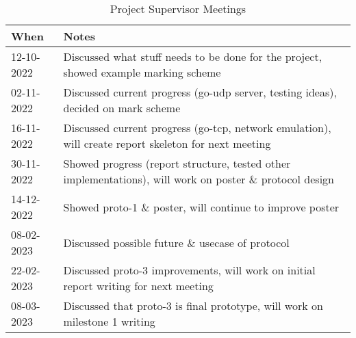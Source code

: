 \begin{table}[h!]
    \caption{Project Supervisor Meetings}
    \label{tab:project-supervisor-meetings}
    \centering
	\begin{tabularx}{\textwidth}{l X}
		\textbf{When} & \textbf{Notes}                                                                                           \\
		\hline
		12-10-2022    & Discussed what stuff needs to be done for the project, showed example marking scheme                     \\
		\hline
		02-11-2022    & Discussed current progress (go-udp server, testing ideas), decided on mark scheme                        \\
		\hline
		16-11-2022    & Discussed current progress (go-tcp, network emulation), will create report skeleton for next meeting     \\
		\hline
		30-11-2022    & Showed progress (report structure, tested other implementations), will work on poster \& protocol design \\
		\hline
		14-12-2022    & Showed proto-1 \& poster, will continue to improve poster                                                \\
		\hline
		08-02-2023    & Discussed possible future \& usecase of protocol                                                         \\
		\hline
		22-02-2023    & Discussed proto-3 improvements, will work on initial report writing for next meeting                     \\
		\hline
		08-03-2023    & Discussed that proto-3 is final prototype, will work on milestone 1 writing                              \\
		\hline
	\end{tabularx}
\end{table}
